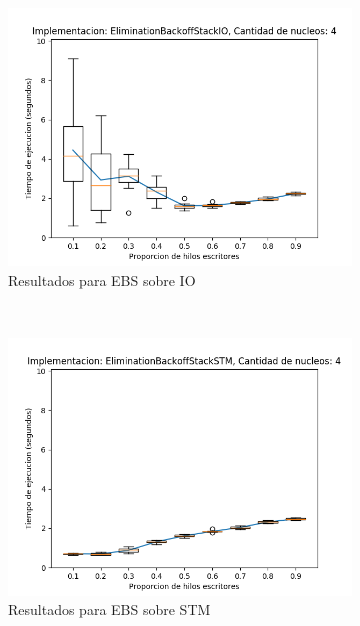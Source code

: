 \begin{appendices}
\begin{figure}[t]
    \centering
    \begin{subfigure}[b]{0.49\textwidth}
        \includegraphics[width=\textwidth]{images/pushPercentages/plots/expEBSIO-4}
        \caption{Resultados para EBS sobre IO}
        \label{subfig:pushPercentages-ebsio-4}
    \end{subfigure}
    ~
    \begin{subfigure}[b]{0.49\textwidth}
        \includegraphics[width=\textwidth]{images/pushPercentages/plots/expEBSSTM-4}
        \caption{Resultados para EBS sobre STM}
        \label{subfig:pushPercentages-ebsstm-4}
    \end{subfigure}
    \begin{subfigure}[b]{0.49\textwidth}

\end{subfigure}
\end{figure}
\end{appendices}
